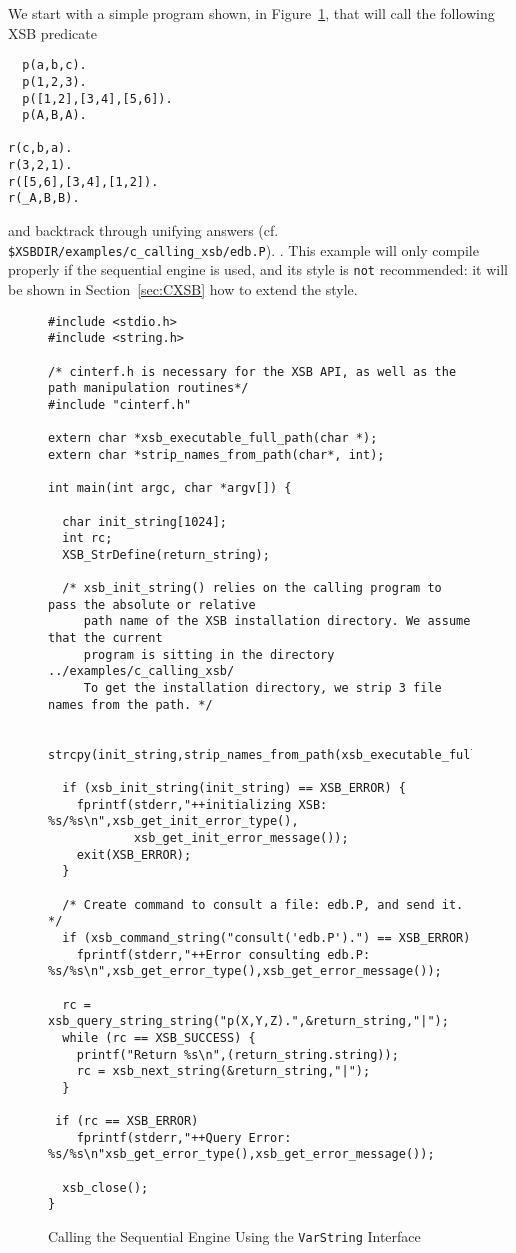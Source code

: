 We start with a simple program shown, in Figure~\ref{fig:varstringex},
that will call the following XSB predicate
%
\begin{small}
\begin{verbatim}
  p(a,b,c).
  p(1,2,3).
  p([1,2],[3,4],[5,6]).
  p(A,B,A).

r(c,b,a).
r(3,2,1).
r([5,6],[3,4],[1,2]).
r(_A,B,B).

\end{verbatim}
\end{small}
%
and backtrack through unifying answers (cf. {\tt
  \$XSBDIR/examples/c\_calling\_xsb/edb.P}).  .  This example will
only compile properly if the sequential engine is used, and its style
is {\tt not} recommended: it will be shown in Section~\ref{sec:CXSB}
how to extend the style.
%
\begin{figure}[hbtp]
\begin{small}
\begin{verbatim}
#include <stdio.h>
#include <string.h>

/* cinterf.h is necessary for the XSB API, as well as the path manipulation routines*/
#include "cinterf.h"

extern char *xsb_executable_full_path(char *);
extern char *strip_names_from_path(char*, int);

int main(int argc, char *argv[]) { 

  char init_string[1024];
  int rc;
  XSB_StrDefine(return_string);

  /* xsb_init_string() relies on the calling program to pass the absolute or relative
     path name of the XSB installation directory. We assume that the current
     program is sitting in the directory ../examples/c_calling_xsb/
     To get the installation directory, we strip 3 file names from the path. */

  strcpy(init_string,strip_names_from_path(xsb_executable_full_path(argv[0]),3));

  if (xsb_init_string(init_string) == XSB_ERROR) {
    fprintf(stderr,"++initializing XSB: %s/%s\n",xsb_get_init_error_type(),
            xsb_get_init_error_message());
    exit(XSB_ERROR);
  }

  /* Create command to consult a file: edb.P, and send it. */
  if (xsb_command_string("consult('edb.P').") == XSB_ERROR)
    fprintf(stderr,"++Error consulting edb.P: %s/%s\n",xsb_get_error_type(),xsb_get_error_message());

  rc = xsb_query_string_string("p(X,Y,Z).",&return_string,"|");
  while (rc == XSB_SUCCESS) {
    printf("Return %s\n",(return_string.string));
    rc = xsb_next_string(&return_string,"|");
  }
 
 if (rc == XSB_ERROR) 
    fprintf(stderr,"++Query Error: %s/%s\n"xsb_get_error_type(),xsb_get_error_message());

  xsb_close();     
}
\end{verbatim}
\end{small}
\caption{Calling the Sequential Engine Using the {\tt VarString} Interface} \label{fig:varstringex}
\end{figure}

